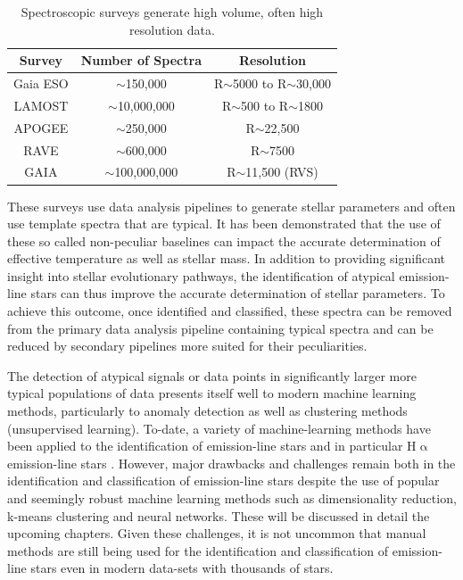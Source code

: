 \begin{table}[!htb]
\begin{center}
\begin{tabular}{|c|c|c|}
\hline
\textbf{Survey} & \textbf{Number of Spectra} & \textbf{Resolution} \\ \hline
Gaia ESO        & $\sim$150,000              & R$\sim$5000 to R$\sim$30,000             \\ \hline
LAMOST          & $\sim$10,000,000           & R$\sim$500 to R$\sim$1800              \\ \hline
APOGEE          & $\sim$250,000              & R$\sim$22,500             \\ \hline
RAVE            & $\sim$600,000              & R$\sim$7500                 \\ \hline
GAIA            & $\sim$100,000,000          & R$\sim$11,500 (RVS)               \\ \hline
\end{tabular}
\caption{Spectroscopic surveys generate high volume, often high resolution data.}
\label{table:draglift1}
\end{center}
\end{table}
These surveys use data analysis pipelines to generate stellar parameters and often use template spectra that are typical. It has been demonstrated that the use of these so called non-peculiar baselines can impact the accurate determination of effective temperature \cite{cayrel2011halpha}\cite{amarsi2018effective}\cite{giribaldi2019accurate} as well as stellar mass\cite{ness2016spectroscopic}\cite{bergemann2016gaia}. In addition to providing significant insight into stellar evolutionary pathways, the identification of atypical emission-line stars can thus improve the accurate determination of stellar parameters. To achieve this outcome, once identified and classified, these spectra can be removed from the primary data analysis pipeline containing typical spectra and can be reduced by secondary pipelines more suited for their peculiarities. 

The detection of atypical signals or data points in significantly larger more typical populations of data presents itself well to modern machine learning methods, particularly to anomaly detection as well as clustering methods (unsupervised learning). To-date, a variety of machine-learning methods have been applied to the identification of emission-line stars and in particular H$\upalpha$ emission-line stars . However, major drawbacks and challenges remain both in the identification and classification of emission-line stars despite the use of popular and seemingly robust machine learning methods such as dimensionality reduction, k-means clustering and neural networks. These will be discussed in detail the upcoming chapters. Given these challenges, it is not uncommon that manual methods are still being used for the identification and classification of emission-line stars even in modern data-sets with thousands of stars\cite{zhang2021catalog}. 

